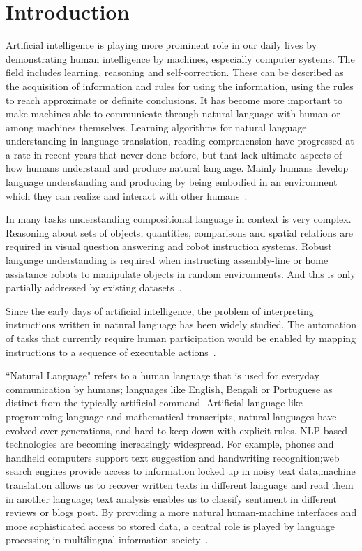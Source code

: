 \chapter{Introduction}
Artificial intelligence is playing more prominent role in our daily lives by demonstrating human intelligence by machines, especially computer systems. The field includes learning, reasoning and self-correction. These can be described as the acquisition of information and rules for using the information, using the rules to reach approximate or definite conclusions. It has become more important to make machines able to communicate through natural language with human or among machines themselves. Learning algorithms for natural language understanding in language translation, reading comprehension have progressed at a rate in recent years that never done before, but that lack ultimate aspects of how humans understand and produce natural language. Mainly humans develop language understanding and producing by being embodied in an environment which they can realize and interact with other humans~\cite{DBLP:journals/corr/abs-1807-03367}.

In many tasks understanding compositional language in context is very complex. Reasoning about sets of objects, quantities, comparisons and spatial relations are required in visual question answering and robot instruction systems. Robust language understanding is required when instructing assembly-line or home assistance robots to manipulate objects in random environments. And this is only partially addressed by existing datasets~\cite{Suhr2017ACO}.

Since the early days of artificial intelligence, the problem of interpreting instructions written in natural language has been widely studied. The automation of tasks that currently require human participation would be enabled by mapping instructions to a sequence of executable actions~\cite{RL}.



``Natural Language" refers to a human language that is used for everyday communication by humans; languages like English, Bengali or Portuguese as distinct from the typically artificial command. Artificial language like programming language and mathematical transcripts, natural languages have evolved over generations, and hard to keep down with explicit rules. NLP based technologies are becoming increasingly widespread. For example, phones and handheld computers support text suggestion and handwriting recognition;web search engines provide access to information locked up in noisy text data;machine translation allows us to recover written texts in different language and read them in another language; text analysis enables us to classify sentiment in different reviews or blogs post. By providing a more natural human-machine interfaces and more sophisticated access to stored data, a central role is played by language processing in multilingual information society~\cite{NLPbook}.

